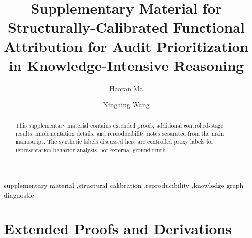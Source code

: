 \documentclass[a4paper,fleqn]{cas-sc}
\begin{document}
\let\WriteBookmarks\relax
\def\floatpagepagefraction{1}
\def\textpagefraction{.001}


\title[mode=title]{Supplementary Material for Structurally-Calibrated Functional Attribution for Audit Prioritization in Knowledge-Intensive Reasoning}

\author[1]{Haoran Ma}

\author[1,2]{Ningning Wang}




\begin{abstract}
This supplementary material contains extended proofs, additional controlled-stage results, implementation details, and reproducibility notes separated from the main manuscript. The synthetic labels discussed here are controlled proxy labels for representation-behavior analysis, not external ground truth.
\end{abstract}

\begin{keywords}
supplementary material \sep structural calibration \sep reproducibility \sep knowledge graph diagnostic
\end{keywords}

\maketitle

\appendix
\makeatletter
\renewcommand{\thetable}{\@Alph\c@section.\arabic{table}}
\renewcommand{\thefigure}{\@Alph\c@section.\arabic{figure}}
\renewcommand{\thealgorithm}{\@Alph\c@section.\arabic{algorithm}}
\renewcommand{\theequation}{\@Alph\c@section.\arabic{equation}}
\makeatother

\section{Extended Proofs and Derivations}
\label{app:proofs}
\end{document}
